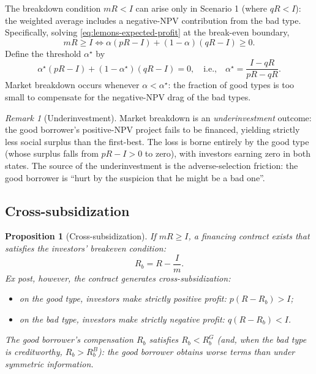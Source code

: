\documentclass[11pt,a4paper,oneside]{book}
\def\geq{\geqslant}
\theoremstyle{plain}
\newtheorem{proposition}[theorem]{Proposition}
\theoremstyle{definition}
\theoremstyle{remark}
\newtheorem{remark}[theorem]{Remark}
\numberwithin{equation}{chapter}
\begin{document}
The breakdown condition $mR < I$ can arise only in Scenario 1 (where $qR < I$): the weighted average includes a negative-NPV contribution from the bad type.
Specifically, solving \eqref{eq:lemons-expected-profit} at the break-even boundary,
\begin{equation*}
  m R \geq I
  \Longleftrightarrow
  \alpha (pR - I) + (1-\alpha)(qR - I) \geq 0.
\end{equation*}
Define the threshold $\alpha^\star$ by
\begin{equation}\label{eq:lemons-alpha-star}
  \alpha^\star (pR - I) + (1 - \alpha^\star)(qR - I) = 0,
  \quad \text{i.e.,} \quad
  \alpha^\star = \frac{I - qR}{pR - qR}.
\end{equation}
Market breakdown occurs whenever $\alpha < \alpha^\star$: the fraction of good types is too small to compensate for the negative-NPV drag of the bad types.

\begin{remark}[Underinvestment]\label{rem:lemons-underinvestment}
Market breakdown is an \emph{underinvestment} outcome: the good borrower's positive-NPV project fails to be financed, yielding strictly less social surplus than the first-best.
The loss is borne entirely by the good type (whose surplus falls from $pR - I > 0$ to zero), with investors earning zero in both states.
The source of the underinvestment is the adverse-selection friction: the good borrower is ``hurt by the suspicion that he might be a bad one''.
\end{remark}

\subsection{Cross-subsidization}

\begin{proposition}[Cross-subsidization]\label{prop:lemons-cross-subsidy}
If $mR \geq I$, a financing contract exists that satisfies the investors' breakeven condition:
\begin{equation}\label{eq:lemons-Rb-pool}
  R_b = R - \frac{I}{m}.
\end{equation}
Ex post, however, the contract generates cross-subsidization:
\begin{itemize}
  \item on the good type, investors make strictly positive profit: $p(R - R_b) > I$;
  \item on the bad type, investors make strictly negative profit: $q(R - R_b) < I$.
\end{itemize}
The good borrower's compensation $R_b$ satisfies $R_b < R_b^{G}$ (and, when the bad type is creditworthy, $R_b > R_b^{B}$): the good borrower obtains worse terms than under symmetric information.
\end{proposition}
\end{document}

